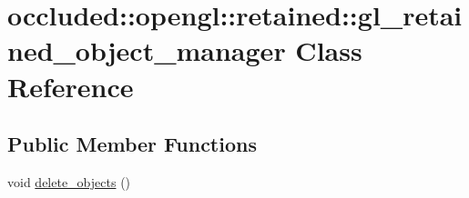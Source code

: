 \hypertarget{classoccluded_1_1opengl_1_1retained_1_1gl__retained__object__manager}{\section{occluded\+:\+:opengl\+:\+:retained\+:\+:gl\+\_\+retained\+\_\+object\+\_\+manager Class Reference}
\label{classoccluded_1_1opengl_1_1retained_1_1gl__retained__object__manager}
}
\subsection*{Public Member Functions}
\begin{DoxyCompactItemize}
\item 
\hypertarget{classoccluded_1_1opengl_1_1retained_1_1gl__retained__object__manager_a3b2d86f6665a12655bb19c163a3190f5}{void \hyperlink{classoccluded_1_1opengl_1_1retained_1_1gl__retained__object__manager_a3b2d86f6665a12655bb19c163a3190f5}{delete\+\_\+objects} ()}\label{classoccluded_1_1opengl_1_1retained_1_1gl__retained__object__manager_a3b2d86f6665a12655bb19c163a3190f5}


\end{DoxyCompactItemize}
